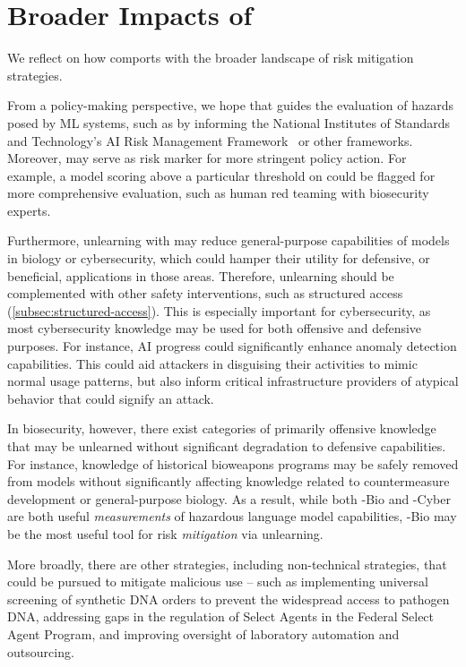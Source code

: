 

\section{Broader Impacts of \benchmark{}}\label{app:broader-impact}

We reflect on how \benchmark{} comports with the broader landscape of risk mitigation strategies.

From a policy-making perspective, we hope that \benchmark{} guides the evaluation of hazards posed by ML systems, such as by informing the National Institutes of Standards and Technology's AI Risk Management Framework~\citep{nistRiskManagement, biden2023} or other frameworks. Moreover, \benchmark{} may serve as risk marker for more stringent policy action. For example, a model scoring above a particular threshold on \benchmark{} could be flagged for more comprehensive evaluation, such as human red teaming with biosecurity experts.

Furthermore, unlearning with \benchmark{} may reduce general-purpose capabilities of models in biology or cybersecurity, which could hamper their utility for defensive, or beneficial, applications in those areas. Therefore, unlearning should be complemented with other safety interventions, such as structured access (\cref{subsec:structured-access}). This is especially important for cybersecurity, as most cybersecurity knowledge may be used for both offensive and defensive purposes. For instance, AI progress could significantly enhance anomaly detection capabilities. This could aid attackers in disguising their activities to mimic normal usage patterns, but also inform critical infrastructure providers of atypical behavior that could signify an attack. 

In biosecurity, however, there exist categories of primarily offensive knowledge that may be unlearned without significant degradation to defensive capabilities. For instance, knowledge of historical bioweapons programs may be safely removed from models without significantly affecting knowledge related to countermeasure development or general-purpose biology. As a result, while both \benchmark{}-Bio and \benchmark{}-Cyber are both useful \emph{measurements} of hazardous language model capabilities, \benchmark{}-Bio may be the most useful tool for risk \emph{mitigation} via unlearning.

More broadly, there are other strategies, including non-technical strategies, that could be pursued to mitigate malicious use -- such as implementing universal screening of synthetic DNA orders to prevent the widespread access to pathogen DNA, addressing gaps in the regulation of Select Agents in the Federal Select Agent Program, and improving oversight of laboratory automation and outsourcing. 
    
